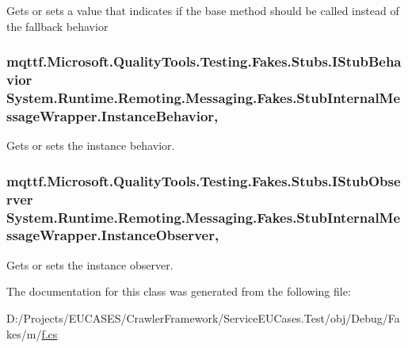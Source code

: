 Gets or sets a value that indicates if the base method should be called instead of the fallback behavior

\hypertarget{class_system_1_1_runtime_1_1_remoting_1_1_messaging_1_1_fakes_1_1_stub_internal_message_wrapper_ab7c75c36692378ef7496200b99d60799}{
\subsubsection[{Instance\-Behavior}]{\setlength{\rightskip}{0pt plus 5cm}mqttf.\-Microsoft.\-Quality\-Tools.\-Testing.\-Fakes.\-Stubs.\-I\-Stub\-Behavior System.\-Runtime.\-Remoting.\-Messaging.\-Fakes.\-Stub\-Internal\-Message\-Wrapper.\-Instance\-Behavior\hspace{0.3cm}{\ttfamily [get]}, {\ttfamily [set]}}}\label{class_system_1_1_runtime_1_1_remoting_1_1_messaging_1_1_fakes_1_1_stub_internal_message_wrapper_ab7c75c36692378ef7496200b99d60799}


Gets or sets the instance behavior.

\hypertarget{class_system_1_1_runtime_1_1_remoting_1_1_messaging_1_1_fakes_1_1_stub_internal_message_wrapper_a2ac642b7c0748f2d3c882022523fb1b6}{
\subsubsection[{Instance\-Observer}]{\setlength{\rightskip}{0pt plus 5cm}mqttf.\-Microsoft.\-Quality\-Tools.\-Testing.\-Fakes.\-Stubs.\-I\-Stub\-Observer System.\-Runtime.\-Remoting.\-Messaging.\-Fakes.\-Stub\-Internal\-Message\-Wrapper.\-Instance\-Observer\hspace{0.3cm}{\ttfamily [get]}, {\ttfamily [set]}}}\label{class_system_1_1_runtime_1_1_remoting_1_1_messaging_1_1_fakes_1_1_stub_internal_message_wrapper_a2ac642b7c0748f2d3c882022523fb1b6}


Gets or sets the instance observer.



The documentation for this class was generated from the following file\-:\begin{DoxyCompactItemize}
\item 
D\-:/\-Projects/\-E\-U\-C\-A\-S\-E\-S/\-Crawler\-Framework/\-Service\-E\-U\-Cases.\-Test/obj/\-Debug/\-Fakes/m/\hyperlink{m_2f_8cs}{f.\-cs}\end{DoxyCompactItemize}
